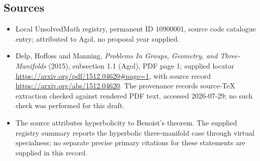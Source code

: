 \documentclass[11pt]{article}
\begin{document}
\subsection{Sources}
\begin{itemize}
\item Local UnsolvedMath registry, permanent ID 10900001, source code catalogue entry; attributed to Agol, no proposal year supplied.
\item Delp, Hoffoss and Manning, \emph{Problems In Groups, Geometry, and Three-Manifolds} (2015), subsection 1.1 (Agol), PDF page 1; supplied locator \url{https://arxiv.org/pdf/1512.04620#page=1}, with source record \url{https://arxiv.org/abs/1512.04620}. The provenance records source-TeX extraction checked against rendered PDF text, accessed 2026-07-29; no such check was performed for this draft.
\item The source attributes hyperbolicity to Benoist's theorem. The supplied registry summary reports the hyperbolic three-manifold case through virtual specialness; no separate precise primary citations for these statements are supplied in this record.
\end{itemize}
\end{document}
